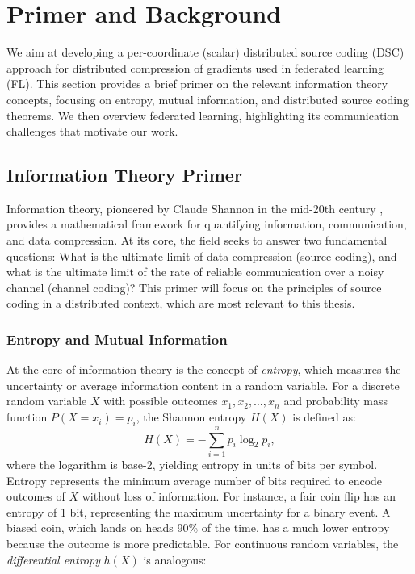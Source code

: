 \section{Primer and Background}

We aim at developing a per-coordinate (scalar) distributed source coding (DSC) approach for distributed compression of gradients used in federated learning (FL). This section provides a brief primer on the relevant information theory concepts, focusing on entropy, mutual information, and distributed source coding theorems. We then overview federated learning, highlighting its communication challenges that motivate our work.

\subsection{Information Theory Primer}


Information theory, pioneered by Claude Shannon in the mid-20th century \cite{6773024}, provides a mathematical framework for quantifying information, communication, and data compression. At its core, the field seeks to answer two fundamental questions: What is the ultimate limit of data compression (source coding), and what is the ultimate limit of the rate of reliable communication over a noisy channel (channel coding)? This primer will focus on the principles of source coding in a distributed context, which are most relevant to this thesis.


\subsubsection{Entropy and Mutual Information}

At the core of information theory is the concept of \emph{entropy}, which measures the uncertainty or average information content in a random variable. For a discrete random variable $X$ with possible outcomes $x_1, x_2, \dots, x_n$ and probability mass function $P(X = x_i) = p_i$, the Shannon entropy $H(X)$ is defined as:
\begin{equation}
    H(X) = -\sum_{i=1}^n p_i \log_2 p_i,
\end{equation}
where the logarithm is base-2, yielding entropy in units of bits per symbol. Entropy represents the minimum average number of bits required to encode outcomes of $X$ without loss of information. For instance, a fair coin flip has an entropy of 1 bit, representing the maximum uncertainty for a binary event. A biased coin, which lands on heads 90\% of the time, has a much lower entropy because the outcome is more predictable. For continuous random variables, the \emph{differential entropy} $h(X)$ is analogous:

